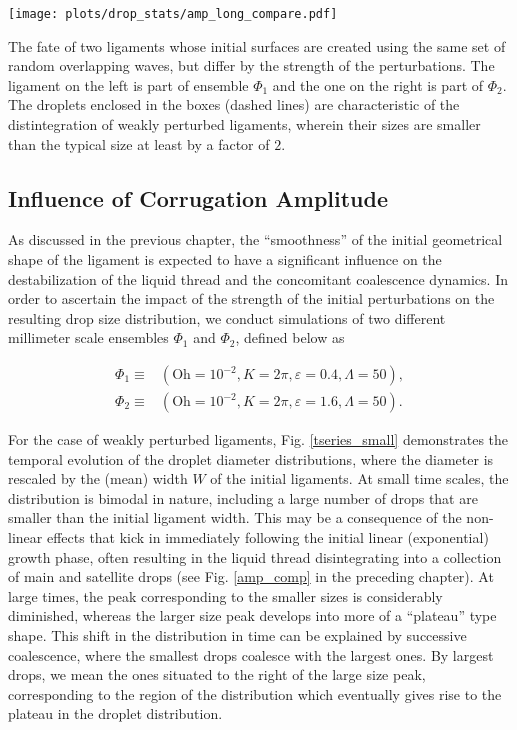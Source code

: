 


\begin{marginfigure}[2cm]
\centering
\texttt{[image: plots/drop\_stats/amp\_long\_compare.pdf]}
	\caption{The fate of two ligaments whose initial surfaces 
	are created using the same set of random overlapping waves, 
	but differ by the strength of the perturbations.
	The ligament on the left is part of ensemble $\Phi_1$ 
	and the one on the right is part of $\Phi_2$. 
	The droplets enclosed in the boxes (dashed lines)
	are characteristic of the distintegration of weakly perturbed ligaments,
	wherein their sizes are smaller than the typical size at least by a factor of $2$. 
	}
\label{amp_long_comp}
\end{marginfigure}


\subsection*{Influence of Corrugation Amplitude}
As discussed in the previous chapter, the ``smoothness'' of the initial geometrical
shape of the ligament is expected to have a significant influence on the 
destabilization of the liquid thread and the concomitant coalescence dynamics.
In order to ascertain the impact of the strength of the initial perturbations
on the resulting drop size distribution, we conduct simulations of two different 
millimeter scale ensembles $\Phi_1$ and $\Phi_2$, defined below as 

\begin{align}
	\Phi_1 \equiv & \left( \textrm{Oh} = 10^{-2}, K = 2\pi , \varepsilon = 0.4 , \Lambda = 50 \right) ,  \\
	\Phi_2 \equiv & \left( \textrm{Oh} = 10^{-2}, K = 2\pi , \varepsilon = 1.6 , \Lambda = 50 \right) . 
\end{align}

For the case of weakly perturbed ligaments, Fig. \ref{tseries_small} 
demonstrates the temporal evolution of the droplet diameter distributions, 
where the diameter is rescaled by the (mean) width $W$ of the initial ligaments. 
At small time scales, the distribution is bimodal in nature, including a large
number of drops that are smaller than the initial ligament width. 
This may be a consequence of the non-linear effects \cite{sat_1, sat_2} 
that kick in immediately following the initial linear (exponential) growth phase, 
often resulting in the liquid thread disintegrating into a collection of main 
and satellite drops (see Fig. \ref{amp_comp} in the preceding chapter). 
At large times, the peak corresponding to the smaller sizes is considerably diminished, 
whereas the larger size peak develops into more of a ``plateau'' type shape.  
This shift in the distribution in time can be explained by 
successive coalescence, where the smallest drops coalesce with the largest ones. 
By largest drops, we mean the ones situated to the right of the large size peak, 
corresponding to the region of the distribution which eventually 
gives rise to the plateau in the droplet distribution.


